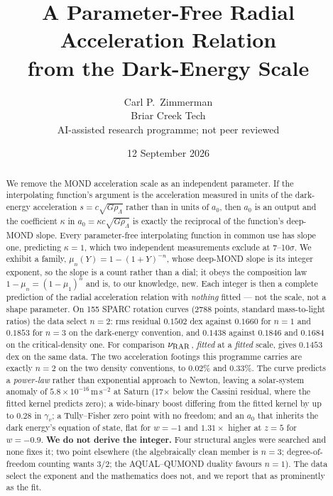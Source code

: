 \documentclass[11pt,letterpaper]{article}
\title{A Parameter-Free Radial Acceleration Relation\\ from the Dark-Energy Scale}
\author{Carl P.\ Zimmerman\\ \small Briar Creek Tech\\ \small AI-assisted research programme; not peer reviewed}
\date{12 September 2026}
\begin{document}
\maketitle
\begin{abstract}
We remove the MOND acceleration scale as an independent parameter. If the interpolating function's argument is the acceleration measured in units of the dark-energy acceleration $s=c\sqrt{G\rho_\Lambda}$ rather than in units of $a_0$, then $a_0$ is an output and the coefficient $\kappa$ in $a_0=\kappa c\sqrt{G\rho_\Lambda}$ is exactly the reciprocal of the function's deep-MOND slope. Every parameter-free interpolating function in common use has slope one, predicting $\kappa=1$, which two independent measurements exclude at 7--10$\sigma$. We exhibit a family, $\mu_n(Y)=1-(1+Y)^{-n}$, whose deep-MOND slope is its integer exponent, so the slope is a count rather than a dial; it obeys the composition law $1-\mu_n=(1-\mu_1)^n$ and is, to our knowledge, new. Each integer is then a complete prediction of the radial acceleration relation with \emph{nothing} fitted --- not the scale, not a shape parameter. On 155 SPARC rotation curves (2788 points, standard mass-to-light ratios) the data select $n=2$: rms residual $0.1502$ dex against $0.1660$ for $n=1$ and $0.1853$ for $n=3$ on the dark-energy convention, and $0.1438$ against $0.1846$ and $0.1684$ on the critical-density one. For comparison $\nu_{\rm RAR}$, \emph{fitted} at a \emph{fitted} scale, gives $0.1453$ dex on the same data. The two acceleration footings this programme carries are exactly $n=2$ on the two density conventions, to $0.02\%$ and $0.33\%$. The curve predicts a \emph{power-law} rather than exponential approach to Newton, leaving a solar-system anomaly of $5.8\times10^{-16}\,$m$\,$s$^{-2}$ at Saturn (17$\times$ below the Cassini residual, where the fitted kernel predicts zero); a wide-binary boost differing from the fitted kernel by up to $0.28$ in $\gamma_v$; a Tully--Fisher zero point with no freedom; and an $a_0$ that inherits the dark energy's equation of state, flat for $w=-1$ and $1.31\times$ higher at $z=5$ for $w=-0.9$. \textbf{We do not derive the integer.} Four structural angles were searched and none fixes it; two point elsewhere (the algebraically clean member is $n=3$; degree-of-freedom counting wants $3/2$; the AQUAL--QUMOND duality favours $n=1$). The data select the exponent and the mathematics does not, and we report that as prominently as the fit.
\end{abstract}
\end{document}

